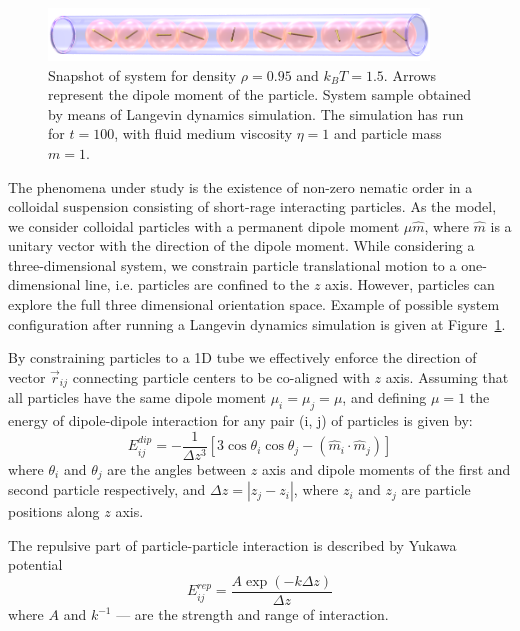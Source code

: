 \documentclass[12pt, a4paper]{article}
\author{Maksym Polovyi}
\newcommand{\figref}[1]{Figure~\ref{#1}}
\begin{document}
\begin{figure}[t]
\centering
	\includegraphics[width=0.9\textwidth]{Images/fullSystemPicture}
	\captionsetup{justification=centering, width=0.9\textwidth}
	\caption{Snapshot of system for density $\rho = 0.95$ and $k_BT = 1.5$. Arrows represent the dipole moment of the particle. System sample obtained by means of Langevin dynamics simulation. The simulation has run for $t = 100$, with fluid medium viscosity $\eta = 1$ and particle mass $m = 1$.}
	\label{fig:fullSystemPicture}
\end{figure}

The phenomena under study is the existence of non-zero nematic order in a colloidal suspension consisting of short-rage interacting particles. As the model, we consider colloidal particles with a permanent dipole moment $\mu \hat{m}$, where $\hat{m}$ is a unitary vector with the direction of the dipole moment. While considering a three-dimensional system, we constrain particle translational motion to a one-dimensional line, i.e. particles are confined to the $z$ axis. However, particles can explore the full three dimensional orientation space. Example of possible system configuration after running a Langevin dynamics simulation is given at \figref{fig:fullSystemPicture}.

By constraining particles to a 1D tube we effectively enforce the direction of vector $\vec{r}_{ij}$ connecting particle centers to be co-aligned with $z$ axis. Assuming that all particles have the same dipole moment $\mu_i = \mu_j = \mu$, and defining $\mu = 1$ the energy of dipole-dipole interaction for any pair (i, j) of particles is given by:
\begin{equation}
\label{eq:dipole_dipole_1D}
E_{ij}^{dip} = - \frac{1}{\Delta z^3} [3 \cos \theta_i \cos \theta_j - (\hat{m}_i \cdot \hat{m}_j)]
\end{equation}
where $\theta_i$ and $\theta_j$ are the angles between $z$ axis and dipole moments of the first and second particle respectively, and $\Delta z = |z_j - z_i|$, where $z_i$ and $z_j$ are particle positions along $z$ axis.

The repulsive part of particle-particle interaction is described by Yukawa potential
\begin{equation}
\label{eq:yukawa_interaction}
E_{ij}^{rep} = \frac{A \exp(-k \Delta z)}{\Delta z}
\end{equation}
where $A$ and $k^{-1}$ --- are the strength and range of interaction.
\end{document}
